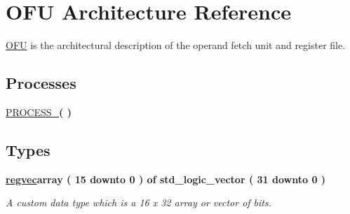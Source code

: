\hypertarget{class_o_f_unit_1_1_o_f_u}{\section{O\-F\-U Architecture Reference}
\label{class_o_f_unit_1_1_o_f_u}
}


\hyperlink{class_o_f_unit_1_1_o_f_u}{O\-F\-U} is the architectural description of the operand fetch unit and register file.  


\subsection*{Processes}
 \begin{DoxyCompactItemize}
\item 
\hyperlink{class_o_f_unit_1_1_o_f_u_ad6cab3590f19d09760591444870d2e29}{P\-R\-O\-C\-E\-S\-S\-\_}{\bfseries  (  )}
\end{DoxyCompactItemize}
\subsection*{Types}
 \begin{DoxyCompactItemize}
\item 
\hypertarget{class_o_f_unit_1_1_o_f_u_a7214ee86d8486f4a264c9251cb623069}{{\bfseries \hyperlink{class_o_f_unit_1_1_o_f_u_a7214ee86d8486f4a264c9251cb623069}{regvec}{\bfseries \textcolor{vhdlkeyword}{array}\textcolor{vhdlchar}{ }\textcolor{vhdlchar}{(}\textcolor{vhdlchar}{ } \textcolor{vhdldigit}{15} \textcolor{vhdlchar}{ }\textcolor{vhdlchar}{ }\textcolor{vhdlchar}{ }\textcolor{vhdlkeyword}{downto}\textcolor{vhdlchar}{ }\textcolor{vhdlchar}{ }\textcolor{vhdlchar}{ } \textcolor{vhdldigit}{0} \textcolor{vhdlchar}{ }\textcolor{vhdlchar}{)}\textcolor{vhdlchar}{ }\textcolor{vhdlchar}{ }\textcolor{vhdlkeyword}{of}\textcolor{vhdlchar}{ }\textcolor{comment}{std\-\_\-logic\-\_\-vector}\textcolor{vhdlchar}{ }\textcolor{vhdlchar}{(}\textcolor{vhdlchar}{ } \textcolor{vhdldigit}{31} \textcolor{vhdlchar}{ }\textcolor{vhdlchar}{ }\textcolor{vhdlchar}{ }\textcolor{vhdlkeyword}{downto}\textcolor{vhdlchar}{ }\textcolor{vhdlchar}{ }\textcolor{vhdlchar}{ } \textcolor{vhdldigit}{0} \textcolor{vhdlchar}{ }\textcolor{vhdlchar}{)}\textcolor{vhdlchar}{ }}} }\label{class_o_f_unit_1_1_o_f_u_a7214ee86d8486f4a264c9251cb623069}

\begin{DoxyCompactList}\small\item\em A custom data type which is a 16 x 32 array or vector of bits. \end{DoxyCompactList}\end{DoxyCompactItemize}
